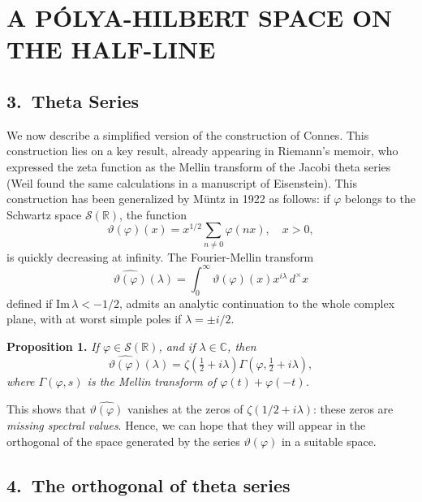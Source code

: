 \documentclass[12pt]{article}
\begin{document}
\section*{A PÓLYA-HILBERT SPACE ON THE HALF-LINE}

\subsection*{3.\ Theta Series}

We now describe a simplified version of the construction of Connes. This construction lies on a key result, already appearing in Riemann's memoir, who expressed the zeta function as the Mellin transform of the Jacobi theta series (Weil found the same calculations in a manuscript of Eisenstein). This construction has been generalized by Müntz in 1922 as follows: if $\varphi$ belongs to the Schwartz space $\mathcal{S}(\mathbb{R})$, the function
\[
\vartheta(\varphi)(x) = x^{1/2} \sum_{n \neq 0} \varphi(nx), \quad x > 0,
\]
is quickly decreasing at infinity. The Fourier-Mellin transform
\[
\widehat{\vartheta(\varphi)}(\lambda) = \int_0^{\infty} \vartheta(\varphi)(x) x^{i\lambda}\,d^{\times}x
\]
defined if $\mathrm{Im}\,\lambda < -1/2$, admits an analytic continuation to the whole complex plane, with at worst simple poles if $\lambda = \pm i/2$.

\medskip

\noindent
\textbf{Proposition 1.} \emph{If $\varphi \in \mathcal{S}(\mathbb{R})$, and if $\lambda \in \mathbb{C}$, then}
\begin{equation}
\widehat{\vartheta(\varphi)}(\lambda) = \zeta\left(\tfrac{1}{2} + i\lambda\right) \Gamma\left(\varphi, \tfrac{1}{2} + i\lambda\right),
\tag{4}
\end{equation}
\emph{where $\Gamma(\varphi, s)$ is the Mellin transform of $\varphi(t) + \varphi(-t)$.}

\medskip

This shows that $\widehat{\vartheta(\varphi)}$ vanishes at the zeros of $\zeta(1/2 + i\lambda)$: these zeros are \emph{missing spectral values}. Hence, we can hope that they will appear in the orthogonal of the space generated by the series $\vartheta(\varphi)$ in a suitable space.

\subsection*{4.\ The orthogonal of theta series}
\end{document}
